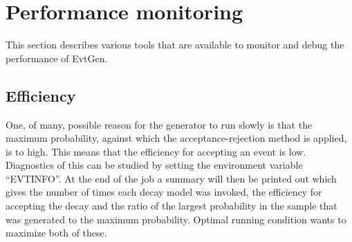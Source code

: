 \section{Performance monitoring}
\label{sect:monitoring}

This section describes various tools that are available to
monitor and debug the performance of EvtGen.

\subsection{Efficiency}
\label{sect:mon_eff}

One, of many, possible reason for the generator to run slowly is that
the maximum probability, against which the acceptance-rejection
method is applied, is to high. This means that the efficiency for
accepting an event is low. Diagnostics of this can be studied by 
setting the environment variable ``EVTINFO''. At the end of the
job a summary will then be printed out which gives the number of
times each decay model was invoked, the efficiency for accepting
the decay and the ratio of the largest probability in the sample
that was generated to the maximum probability. Optimal running
condition wants to maximize both of these. 


